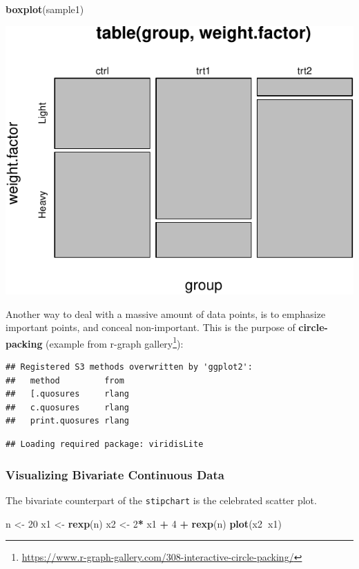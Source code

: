 \documentclass[]{book}
\newenvironment{Shaded}{\begin{snugshade}}{\end{snugshade}}
\newcommand{\DecValTok}[1]{\textcolor[rgb]{0.00,0.00,0.81}{#1}}
\newcommand{\KeywordTok}[1]{\textcolor[rgb]{0.13,0.29,0.53}{\textbf{#1}}}
\newcommand{\NormalTok}[1]{#1}
\newcommand{\OperatorTok}[1]{\textcolor[rgb]{0.81,0.36,0.00}{\textbf{#1}}}
\newcommand{\StringTok}[1]{\textcolor[rgb]{0.31,0.60,0.02}{#1}}
\renewcommand{\href}[2]{#2\footnote{\url{#1}}}
\theoremstyle{definition}
\theoremstyle{definition}
\theoremstyle{definition}
\theoremstyle{remark}
\begin{document}
\begin{Shaded}
\begin{Highlighting}[]
\KeywordTok{boxplot}\NormalTok{(sample1)    }
\end{Highlighting}
\end{Shaded}

\includegraphics[width=0.5\linewidth]{Rcourse_files/figure-latex/unnamed-chunk-136-1}

Another way to deal with a massive amount of data points, is to emphasize important points, and conceal non-important.
This is the purpose of \textbf{circle-packing} (example from \href{https://www.r-graph-gallery.com/308-interactive-circle-packing/}{r-graph gallery}):

\begin{verbatim}
## Registered S3 methods overwritten by 'ggplot2':
##   method         from 
##   [.quosures     rlang
##   c.quosures     rlang
##   print.quosures rlang
\end{verbatim}

\begin{verbatim}
## Loading required package: viridisLite
\end{verbatim}

\hypertarget{htmlwidget-050ab8343a08c822acaf}{}

\hypertarget{visualizing-bivariate-continuous-data}{%
\subsubsection{Visualizing Bivariate Continuous Data}\label{visualizing-bivariate-continuous-data}}

The bivariate counterpart of the \texttt{stipchart} is the celebrated scatter plot.

\begin{Shaded}
\begin{Highlighting}[]
\NormalTok{n <-}\StringTok{ }\DecValTok{20}
\NormalTok{x1 <-}\StringTok{ }\KeywordTok{rexp}\NormalTok{(n)}
\NormalTok{x2 <-}\StringTok{ }\DecValTok{2}\OperatorTok{*}\StringTok{ }\NormalTok{x1 }\OperatorTok{+}\StringTok{ }\DecValTok{4} \OperatorTok{+}\StringTok{ }\KeywordTok{rexp}\NormalTok{(n)}
\KeywordTok{plot}\NormalTok{(x2}\OperatorTok{~}\NormalTok{x1)}
\end{Highlighting}
\end{Shaded}
\end{document}
